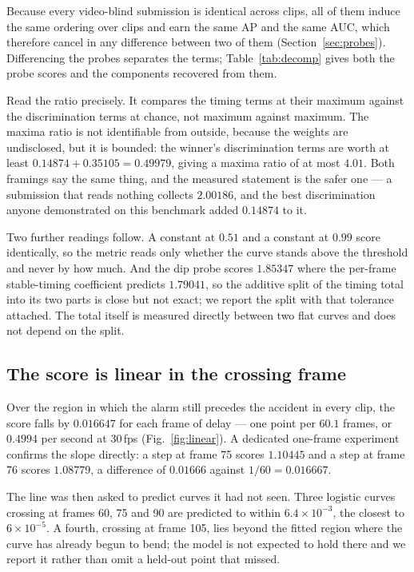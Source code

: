 Because every video-blind submission is identical across clips, all of them
induce the same ordering over clips and earn the same AP and the same AUC,
which therefore cancel in any difference between two of them
(Section~\ref{sec:probes}). Differencing the probes separates the terms;
Table~\ref{tab:decomp} gives both the probe scores and the components recovered
from them.

Read the ratio precisely. It compares the timing terms at their maximum against
the discrimination terms at chance, not maximum against maximum. The maxima
ratio is not identifiable from outside, because the weights are undisclosed,
but it is bounded: the winner's discrimination terms are worth at least
$0.14874 + 0.35105 = 0.49979$, giving a maxima ratio of at most $4.01$. Both
framings say the same thing, and the measured statement is the safer one --- a
submission that reads nothing collects $2.00186$, and the best discrimination
anyone demonstrated on this benchmark added $0.14874$ to it.

Two further readings follow. A constant at $0.51$ and a constant at $0.99$
score identically, so the metric reads only whether the curve stands above the
threshold and never by how much. And the dip probe scores $1.85347$ where the
per-frame stable-timing coefficient predicts $1.79041$, so the additive split of
the timing total into its two parts is close but not exact; we report the split
with that tolerance attached. The total itself is measured directly between two
flat curves and does not depend on the split.

\subsection{The score is linear in the crossing frame}

Over the region in which the alarm still precedes the accident in every clip,
the score falls by $0.016647$ for each frame of delay --- one point per $60.1$
frames, or $0.4994$ per second at 30\,fps (Fig.~\ref{fig:linear}). A dedicated
one-frame experiment confirms the slope directly: a step at frame 75 scores
$1.10445$ and a step at frame 76 scores $1.08779$, a difference of $0.01666$
against $1/60 = 0.016667$.

The line was then asked to predict curves it had not seen. Three logistic
curves crossing at frames 60, 75 and 90 are predicted to within
$6.4\times10^{-3}$, the closest to $6\times10^{-5}$. A fourth, crossing at frame
105, lies beyond the fitted region where the curve has already begun to bend;
the model is not expected to hold there and we report it rather than omit a
held-out point that missed.

